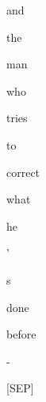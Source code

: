 \documentclass[varwidth=150mm]{standalone}
\begin{document}
\begin{CJK*}{UTF8}{gbsn}
{{{\colorbox{red!1.027238368988037}{\strut and} \colorbox{red!2.7374320030212402}{\strut the} \colorbox{red!2.9923741817474365}{\strut man} \colorbox{red!1.0468637943267822}{\strut who} \colorbox{red!0.0}{\strut tries} \colorbox{red!0.0}{\strut to} \colorbox{red!2.502202272415161}{\strut correct} \colorbox{red!4.588381767272949}{\strut what} \colorbox{red!2.882582902908325}{\strut he} \colorbox{red!0.0}{\strut '} \colorbox{red!0.0}{\strut s} \colorbox{red!0.0}{\strut done} \colorbox{red!1.7927132844924927}{\strut before} \colorbox{red!14.88686466217041}{\strut -} \colorbox{red!38.23597717285156}{\strut [SEP]}
}}}
\end{CJK*}
\end{document}

